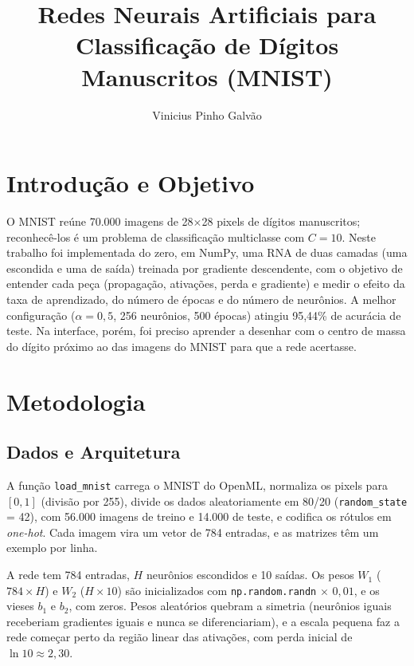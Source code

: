 \documentclass[letterpaper]{article} %
\title{Redes Neurais Artificiais para Classificação de Dígitos Manuscritos (MNIST)}
\author{
    Vinicius Pinho Galvão
}
\begin{document}
\maketitle

\section{Introdução e Objetivo}
O MNIST reúne 70.000 imagens de 28$\times$28 pixels de dígitos manuscritos; reconhecê-los é um problema de classificação multiclasse com $C = 10$. Neste trabalho foi implementada do zero, em NumPy, uma RNA de duas camadas (uma escondida e uma de saída) treinada por gradiente descendente, com o objetivo de entender cada peça (propagação, ativações, perda e gradiente) e medir o efeito da taxa de aprendizado, do número de épocas e do número de neurônios. A melhor configuração ($\alpha = 0{,}5$, 256 neurônios, 500 épocas) atingiu 95,44\% de acurácia de teste. Na interface, porém, foi preciso aprender a desenhar com o centro de massa do dígito próximo ao das imagens do MNIST para que a rede acertasse.

\section{Metodologia}

\subsection{Dados e Arquitetura}
A função \texttt{load\_mnist} carrega o MNIST do OpenML, normaliza os pixels para $[0,1]$ (divisão por 255), divide os dados aleatoriamente em 80/20 (\texttt{random\_state} = 42), com 56.000 imagens de treino e 14.000 de teste, e codifica os rótulos em \emph{one-hot}. Cada imagem vira um vetor de 784 entradas, e as matrizes têm um exemplo por linha.

A rede tem 784 entradas, $H$ neurônios escondidos e 10 saídas. Os pesos $W_1$ ($784 \times H$) e $W_2$ ($H \times 10$) são inicializados com \texttt{np.random.randn}$\,\times\, 0{,}01$, e os vieses $b_1$ e $b_2$, com zeros. Pesos aleatórios quebram a simetria (neurônios iguais receberiam gradientes iguais e nunca se diferenciariam), e a escala pequena faz a rede começar perto da região linear das ativações, com perda inicial de $\ln 10 \approx 2{,}30$.
\end{document}
